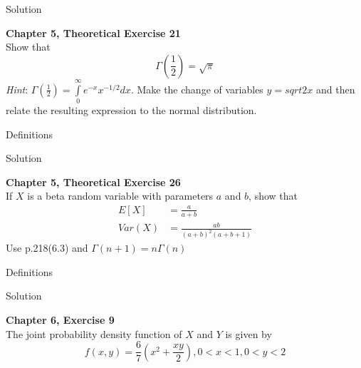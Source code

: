 \documentclass{article}
\begin{document}
\begin{spacing}{1.1}
\begin{homeworkProblem}
\begin{homeworkSection}{Solution}
  \end{homeworkSection}
\end{homeworkProblem}

\newpage
\begin{homeworkProblem}
  {\bf Chapter 5, Theoretical Exercise 21}\\
  Show that 
  \[\Gamma \left(\frac{ 1}{ 2}\right) = \sqrt{ \pi}\]
  \emph{Hint}: $\Gamma\left( \frac{ 1}{ 2}\right) = \int\limits_0^{\infty} e^{-x} x^{-1/2} dx$. 
  Make the change of variables $y = sqrt{ 2x}$ and then relate the resulting expression
  to the normal distribution.
  \begin{homeworkSection}{Definitions}
    
    
  \end{homeworkSection}
  \begin{homeworkSection}{Solution}
    
  \end{homeworkSection}
\end{homeworkProblem}

\newpage
\begin{homeworkProblem}
  {\bf Chapter 5, Theoretical Exercise 26}\\
  If $X$ is a beta random variable with parameters $a$ and $b$, show that
  \begin{align*}
    E[ X]   &= \frac{ a}{ a + b}\\
    Var( X) &= \frac{ a b}{ (a + b)^2 (a + b + 1)}
  \end{align*}
  Use p.218(6.3) and $\Gamma( n + 1) = n \Gamma( n)$
  \begin{homeworkSection}{Definitions}
    
    
  \end{homeworkSection}
  \begin{homeworkSection}{Solution}
    
  \end{homeworkSection}
\end{homeworkProblem}

\newpage
\begin{homeworkProblem}
  {\bf Chapter 6, Exercise 9}\\
  The joint probability density function of $X$ and $Y$ is given by
  \[f( x, y) = \frac{ 6}{ 7} \left( x^2 + \frac{ x y}{ 2}\right), 
    0 < x < 1, 0 < y < 2\]


\end{homeworkProblem}
\end{spacing}
\end{document}
